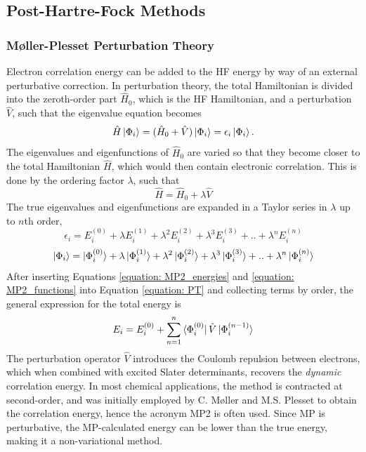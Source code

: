 \subsection{Post-Hartre-Fock Methods}\label{section: methods_postHF}
\subsubsection{M{\o}ller-Plesset Perturbation Theory}
Electron correlation energy can be added to the \ac{HF} energy by way of an external perturbative correction. In perturbation theory, the total Hamiltonian is divided into the zeroth-order part $\hat{H}_{0}$, which is the \ac{HF} Hamiltonian, and a perturbation $\hat{V}$, such that the eigenvalue equation becomes
\begin{equation}\label{equation: PT}
    \hat{H}\ket{\Phi_{i}}=(\hat{H}_{0}+\hat{V})\ket{\Phi_{i}}=\epsilon_{i}\ket{\Phi_{i}}.
\end{equation}
The eigenvalues and eigenfunctions of $\hat{H}_{0}$ are varied so that they become closer to the total Hamiltonian $\hat{H}$, which would then contain electronic correlation. This is done by the ordering factor $\lambda$, such that
\begin{equation}
    \hat{H}=\hat{H}_{0}+\lambda\hat{V}
\end{equation}
The true eigenvalues and eigenfunctions are expanded in a Taylor series in $\lambda$ up to $n$th order,
\begin{equation}\label{equation: MP2_energies}
    \epsilon_{i}=E_{i}^{(0)}+\lambda{}E_{i}^{(1)}+\lambda^{2}E_{i}^{(2)}+\lambda^{3}E_{i}^{(3)}+..+\lambda^{n}E_{i}^{(n)}
\end{equation}
\begin{equation}\label{equation: MP2_functions}
    \ket{\Phi_{i}}=\ket{\Phi_{i}^{(0)}}+\lambda{}\ket{\Phi_{i}^{(1)}}+\lambda^{2}\ket{\Phi_{i}^{(2)}}+\lambda^{3}\ket{\Phi_{i}^{(3)}}+..+\lambda^{n}\ket{\Phi_{i}^{(n)}}
\end{equation}
After inserting Equations \ref{equation: MP2_energies} and \ref{equation: MP2_functions} into Equation \ref{equation: PT} and collecting terms by order, the general expression for the total energy is
\begin{equation}
E_{i}=E_{i}^{(0)}+\sum_{n=1}^{n}\bra{\Phi_{i}^{(0)}}\hat{V}\ket{\Phi_{i}^{(n-1)}}
\end{equation}
The perturbation operator $\hat{V}$ introduces the Coulomb repulsion between electrons, which when combined with excited Slater determinants, recovers the \textit{dynamic} correlation energy. In most chemical applications, the method is contracted at second-order, and was initially employed by C. M{\o}ller and M.S. Plesset to obtain the correlation energy, hence the acronym \ac{MP2} is often used.\cite{Moller1934} Since MP is perturbative, the MP-calculated energy can be lower than the true energy, making it a non-variational method.

